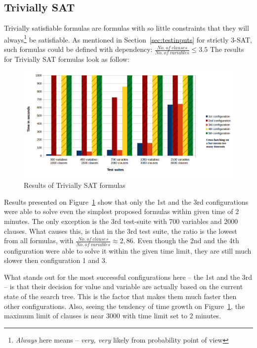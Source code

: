 \documentclass[12pt,english,pdflatex]{aghdpl}
\begin{document}
\subsection{Trivially SAT}
\label{subsec:TrivialSat}
Trivially satisfiable formulas are formulas with so little constraints that they will always\footnote{\textit{Always} here means -- \textit{very, very} likely from probability point of view} be satisfiable. As mentioned in Section~\ref{sec:testinputs} for strictly 3-SAT, such formulas could be defined with dependency: $\frac{No.\ of\ clauses}{No.\ of\ variables} \le 3.5$
The results for Trivially SAT formulas look as follow:
\begin{figure}[H]
\begin{centering}
\includegraphics[scale=0.62]{charts/trivial_sat}
\par\end{centering}
\caption{Results of Trivially SAT formulas}
\label{fig:trsat}
\end{figure}
Results presented on Figure~\ref{fig:trsat} show that only the 1st and the 3rd configurations were able to solve even the simplest proposed formulas within given time of 2 minutes. The only exception is the 3rd test-suite with 700 variables and 2000 clauses. What causes this, is that in the 3rd test suite, the ratio is the lowest from all formulas, with $\frac{No.\ of\ clauses}{No.\ of\ variables} \approx 2,86$. Even though the 2nd and the 4th configuration were able to solve it within the given time limit, they are still much slower then configuration 1 and 3.

What stands out for the most successful configurations here -- the 1st and the 3rd -- is that their decision for value and variable are actually based on the current state of the search tree. This is the factor that makes them much faster then other configurations. Also, seeing the tendency of time growth on Figure~\ref{fig:trsat}, the maximum limit of clauses is near 3000 with time limit set to 2 minutes.
\end{document}
